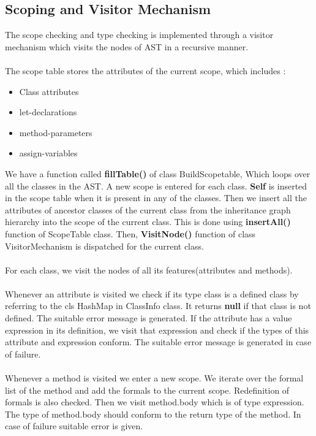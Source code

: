 \documentclass{article}
\begin{document}
\subsection{Scoping and Visitor Mechanism}
The scope checking and type checking is implemented through a visitor mechanism which visits the nodes of AST in a recursive manner. \\ \\
The scope table stores the attributes of the current scope, which includes : \\
\begin{itemize}
    \item Class attributes
    \item let-declarations
    \item method-parameters
    \item assign-variables
\end{itemize}
We have a function called \textbf{fillTable()} of class BuildScopetable, Which loops over all the classes in the AST. A new scope is entered for each class. \textbf{Self} is inserted in the scope table when it is present in any of the classes. Then we insert all the attributes of ancestor classes of the current class from the inheritance graph hierarchy into the scope of the current class. This is done using \textbf{insertAll()} function of ScopeTable class. Then, \textbf{VisitNode()} function of class VisitorMechanism is dispatched for the current class.\\ \\
For each class, we visit the nodes of all its features(attributes and methods).\\ \\
Whenever an attribute is visited we check if its type class is a defined class by referring to the cls HashMap in ClassInfo class. It returns \textbf{null} if that class is not defined. The suitable error message is generated. If the attribute has a value expression in its definition, we visit that expression and check if the types of this attribute and expression conform. The suitable error message is generated in case of failure.\\ \\
Whenever a method is visited we enter a new scope. We iterate over the formal list of the method and add the formals to the current scope. Redefinition of formals is also checked. Then we visit method.body which is of type expression. The type of method.body should conform to the return type of the method. In case of failure suitable error is given.\\ \\
\end{document}
